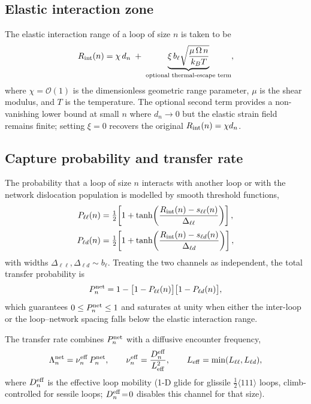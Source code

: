 \documentclass[11pt,a4paper]{article}
\begin{document}
\subsection*{Elastic interaction zone}

The elastic interaction range of a loop of size $n$ is taken to be
\begin{equation}
  R_{\rm int}(n)=\chi\,d_n
  \;+\;\underbrace{\xi\,b_\ell\sqrt{\dfrac{\mu\,\Omega\,n}{k_B T}}}_{\text{optional thermal-escape term}},
  \label{eq:elastic_interaction_zone}
\end{equation}
where $\chi=\mathcal O(1)$ is the dimensionless geometric range
parameter, $\mu$ is the shear modulus, and $T$ is the temperature.
The optional second term provides a non-vanishing lower bound at small
$n$ where $d_n\!\to\!0$ but the elastic strain field remains finite;
setting $\xi=0$ recovers the original $R_{\rm int}(n)=\chi d_n$.

\subsection*{Capture probability and transfer rate}

The probability that a loop of size $n$ interacts with another loop or
with the network dislocation population is modelled by smooth threshold
functions,
\begin{align}
  P_{\ell\ell}(n)
  &=\tfrac{1}{2}\!\left[1+\tanh\!\left(\dfrac{R_{\rm int}(n)-s_{\ell\ell}(n)}{\Delta_{\ell\ell}}\right)\right],
  \label{eq:P_loop_loop}\\[2pt]
  P_{\ell d}(n)
  &=\tfrac{1}{2}\!\left[1+\tanh\!\left(\dfrac{R_{\rm int}(n)-s_{\ell d}(n)}{\Delta_{\ell d}}\right)\right],
  \label{eq:P_loop_dislocation}
\end{align}
with widths $\Delta_{\ell\ell},\Delta_{\ell d}\sim b_\ell$.  Treating
the two channels as independent, the total transfer probability is
\begin{equation}
  P_n^{\rm net}
  =1-\bigl[1-P_{\ell\ell}(n)\bigr]\bigl[1-P_{\ell d}(n)\bigr],
  \label{eq:P_network_total}
\end{equation}
which guarantees $0\le P_n^{\rm net}\le 1$ and saturates at unity when
either the inter-loop or the loop--network spacing falls below the
elastic interaction range.

The transfer rate combines $P_n^{\rm net}$ with a diffusive encounter
frequency,
\begin{equation}
  \Lambda_n^{\rm net}=\nu_n^{\rm eff}\,P_n^{\rm net},\qquad
  \nu_n^{\rm eff}=\frac{D_n^{\rm eff}}{L_{\rm eff}^2},\qquad
  L_{\rm eff}=\min(L_{\ell\ell},L_{\ell d}),
  \label{eq:Lambda_network}
\end{equation}
where $D_n^{\rm eff}$ is the effective loop mobility (1-D glide for
glissile $\tfrac{1}{2}\langle 111\rangle$ loops, climb-controlled for
sessile loops; $D_n^{\rm eff}\!=\!0$ disables this channel for that
size).
\end{document}
